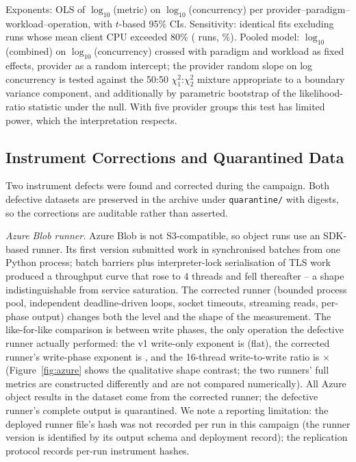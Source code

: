 \documentclass[manuscript,screen,review]{acmart}
\begin{document}
Exponents: OLS of $\log_{10}$(metric) on $\log_{10}$(concurrency) per
provider--paradigm--workload--operation, with $t$-based 95\% CIs. Sensitivity:
identical fits excluding runs whose mean client CPU exceeded 80\% (\gatedRuns{} runs,
\gatedPct\%). Pooled model: $\log_{10}$(combined) on $\log_{10}$(concurrency)
crossed with paradigm and workload as fixed effects, provider as a random
intercept; the provider random slope on log concurrency is tested against the
50:50 $\chi^2_1$:$\chi^2_2$ mixture appropriate to a boundary variance
component, and additionally by parametric bootstrap of the likelihood-ratio
statistic under the null. With five provider groups this test has limited
power, which the interpretation respects.

\subsection{Instrument Corrections and Quarantined Data}\label{sec:instrument}
Two instrument defects were found and corrected during the campaign. Both
defective datasets are preserved in the archive under \texttt{quarantine/}
with digests, so the corrections are auditable rather than asserted.

\emph{Azure Blob runner.} Azure Blob is not S3-compatible, so object runs use
an SDK-based runner. Its first version submitted work in synchronised batches
from one Python process; batch barriers plus interpreter-lock serialisation
of TLS work produced a throughput curve that rose to 4 threads and fell
thereafter -- a shape indistinguishable from service saturation. The
corrected runner (bounded process pool, independent deadline-driven loops,
socket timeouts, streaming reads, per-phase output) changes both the level
and the shape of the measurement. The like-for-like comparison is between
write phases, the only operation the defective runner actually performed:
the v1 write-only exponent is \azureVOneWriteBeta{} (flat), the corrected runner's
write-phase exponent is \azureVTwoWriteBeta, and the 16-thread write-to-write ratio is
\azureWriteRatio$\times$ (Figure~\ref{fig:azure} shows the qualitative shape contrast;
the two runners' full metrics are constructed differently and are not
compared numerically). All Azure object results in the dataset come from
the corrected runner; the defective runner's complete output is quarantined.
We note a reporting limitation: the deployed runner file's hash was not
recorded per run in this campaign (the runner version is identified by its
output schema and deployment record); the replication protocol records
per-run instrument hashes.
\end{document}
